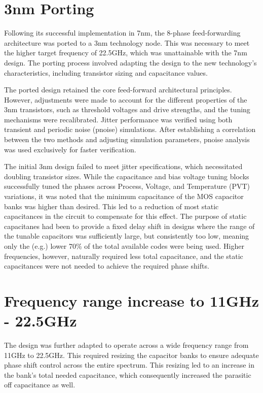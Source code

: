 \section{3nm Porting}\label{sec:3nm_porting}

Following its successful implementation in 7nm, the 8-phase feed-forwarding architecture was ported to a 3nm technology node. This was necessary to meet the higher target frequency of 22.5GHz, which was unattainable with the 7nm design. The porting process involved adapting the design to the new technology's characteristics, including transistor sizing and capacitance values.

The ported design retained the core feed-forward architectural principles. However, adjustments were made to account for the different properties of the 3nm transistors, such as threshold voltages and drive strengths, and the tuning mechanisms were recalibrated. Jitter performance was verified using both transient and periodic noise (pnoise) simulations. After establishing a correlation between the two methods and adjusting simulation parameters, pnoise analysis was used exclusively for faster verification.

The initial 3nm design failed to meet jitter specifications, which necessitated doubling transistor sizes. While the capacitance and bias voltage tuning blocks successfully tuned the phases across Process, Voltage, and Temperature (PVT) variations, it was noted that the minimum capacitance of the MOS capacitor banks was higher than desired. This led to a reduction of most static capacitances in the circuit to compensate for this effect. The purpose of static capacitanes had been to provide a fixed delay shift in designs where the range of the tunable capacitors was sufficiently large, but consistently too low, meaning only the (e.g.) lower 70\% of the total available codes were being used. Higher frequencies, however, naturally required less total capacitance, and the static capacitances were not needed to achieve the required phase shifts. 

\section{Frequency range increase to 11GHz - 22.5GHz}\label{sec:freq_range}

The design was further adapted to operate across a wide frequency range from 11GHz to 22.5GHz. This required resizing the capacitor banks to ensure adequate phase shift control across the entire spectrum. This resizing led to an increase in the bank's total needed capacitance, which consequently increased the parasitic off capacitance as well.

